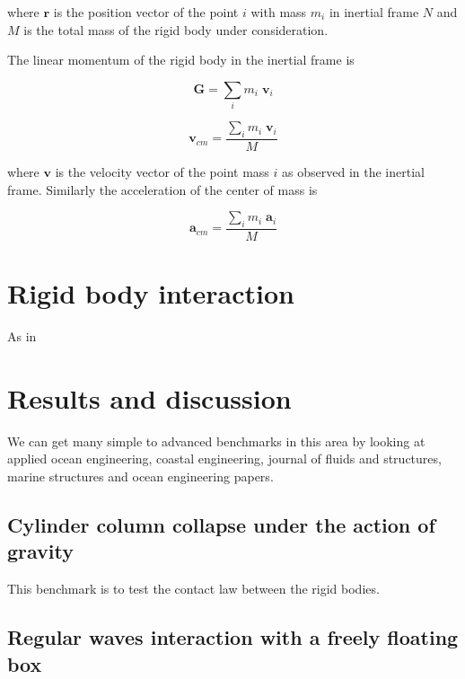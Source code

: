 \documentclass[preprint,12pt]{elsarticle}
\newcommand{\ten}[1]{\ensuremath{\mathbf{#1}}}
\begin{document}
\noindent where $\ten{r}$ is the position vector of the point $i$ with mass
$m_i$ in inertial frame $N$ and $M$ is the total mass of the rigid body under
consideration.


The linear momentum of the rigid body in the inertial frame is


\begin{equation}
  \label{eq:lin-mom-of-rigid-body}
  \ten{G} = \sum_i m_i \; \ten{v}_i
\end{equation}


\begin{equation}
  \label{eq:center-of-mass-velocity}
  \ten{v}_{cm} = \frac{\sum_i m_i \; \ten{v}_i}{M}
\end{equation}

\noindent where $\ten{v}$ is the velocity vector of the point mass $i$ as
observed in the inertial frame. Similarly the acceleration of the center of
mass is


\begin{equation}
  \label{eq:acceleration-of-rigid-body}
  \ten{a}_{cm} = \frac{\sum_i m_i \; \ten{a}_i}{M}
\end{equation}



\section{Rigid body interaction}
\label{sec:rigid-body-inter}

As in




\section{Results and discussion}
\label{sec:results}

We can get many simple to advanced benchmarks in this area by looking at
applied ocean engineering, coastal engineering, journal of fluids and
structures, marine structures and ocean engineering papers.



\subsection{Cylinder column collapse under the action of gravity}
\label{sec:cylinder-column-collapse}


This benchmark is to test the contact law between the rigid bodies.


\subsection{Regular waves interaction with a freely floating box}
\label{sec:cylinder-column-collapse}
\end{document}
